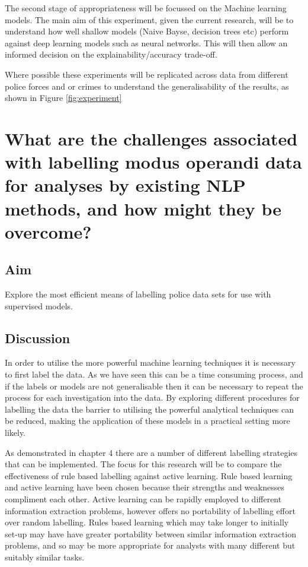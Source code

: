 The second stage of appropriateness will be focussed on the Machine learning models. The main aim of this experiment, given the current research, will be to understand how well shallow models (Naive Bayse, decision trees etc) perform against deep learning models such as neural networks. This will then allow an informed decision on the explainability/accuracy trade-off. 

Where possible these experiments will be replicated across data from different police forces and or crimes to understand the generalisability of the results, as shown in Figure \ref{fig:experiment}


\section{What are the challenges associated with labelling modus operandi data for analyses by existing NLP methods, and how might they be overcome?  }

\subsection{Aim} Explore the most efficient means of labelling police data sets for use with supervised models. 

\subsection{Discussion}In order to utilise the more powerful machine learning techniques it is necessary to first label the data. As we have seen this can be a time consuming process, and if the labels or models are not generalisable then it can be necessary to repeat the process for each investigation into the data. By exploring different procedures for labelling the data the barrier to utilising the powerful analytical techniques can be reduced, making the application of these models in a practical setting more likely.  

As demonstrated in chapter 4 there are a number of different labelling strategies that can be implemented. The focus for this research will  be to compare the effectiveness of rule based labelling against active learning. Rule based learning and active learning have been chosen because their strengths and weaknesses compliment each other. Active learning can be rapidly employed to different information extraction problems, however offers no portability of labelling effort over random labelling. Rules based learning which may take longer to initially set-up may have have greater portability between similar information extraction problems, and so may be more appropriate for analysts with many different but suitably similar tasks.


